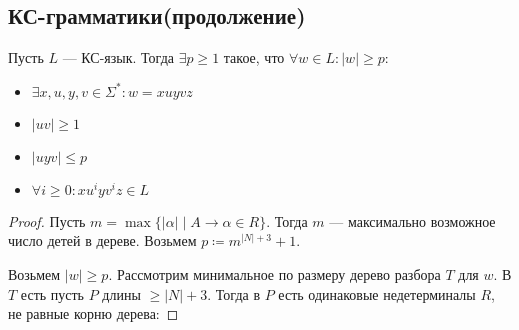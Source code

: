 \subsection{КС-грамматики(продолжение)}
\begin{lemma}[о накачке]
  Пусть $L$ --- КС-язык. Тогда $\exists p \geq 1$ такое, что $\forall w \in L\colon |w| \geq p$:
  \begin{itemize}
    \item $\exists x, u, y, v \in \Sigma^{*}\colon w = x u y v z$
    \item $|uv| \geq 1$
    \item $|uyv| \leq p$
    \item $\forall i \geq 0\colon xu^iyv^iz \in L$
  \end{itemize}
\end{lemma}
\begin{proof} Пусть $m = \max \{|\alpha| \; | \; A \to \alpha \in R\}$. Тогда $m$ --- максимально возможное число детей в дереве. Возьмем $p \coloneqq m^{|N| + 3} + 1$. 

Возьмем $|w| \geq p$. Рассмотрим минимальное по размеру дерево разбора $T$ для $w$. В $T$ есть пусть $P$ длины $\geq |N| + 3$. Тогда в $P$ есть одинаковые недетерминалы $R$, не равные корню дерева:


\center
\begin{tikzpicture}[x=0.75pt,y=0.75pt,yscale=-1,xscale=1]


\end{tikzpicture}
\end{proof}
